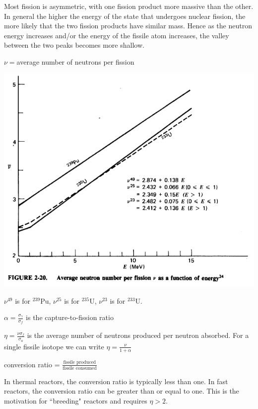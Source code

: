 \documentclass[12pt]{article}
\begin{document}
Most fission is asymmetric, with one fission product more massive than the other. In general the higher the energy of the state that undergoes nuclear fission, the more likely that the two fission products have similar mass. Hence as the neutron energy increases and/or the energy of the fissile atom increases, the valley between the two peaks becomes more shallow.

$\nu=$average number of neutrons per fission
\begin{center}
\includegraphics[scale=0.6]{../figs/nu}
\end{center}
$\nu^{49}$ is for $^{239}$Pu, $\nu^{25}$ is for $^{235}$U, $\nu^{23}$ is for $^{233}$U.


$\alpha = \frac{\sigma_\gamma}{\sigma_f}$ is the capture-to-fission ratio

$\eta = \frac{\nu \sigma_f}{\sigma_a}$ is the average number of neutrons produced per neutron absorbed. For a single fissile isotope we can write $\eta = \frac{\nu}{1+\alpha}$

conversion ratio = $\frac{\text{fissile produced}}{\text{fissile consumed}}$

In thermal reactors, the conversion ratio is typically less than one. In fast reactors, the conversion ratio can be greater than or equal to one. This is the motivation for ``breeding" reactors and requires $\eta >2$.
\end{document}
